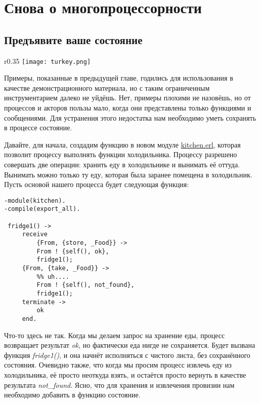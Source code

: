 \chapter{Снова о многопроцессорности}
\section{Предъявите ваше состояние}
\begin{wrapfigure}{r}{0.35\linewidth}
    \texttt{[image: turkey.png]}
\end{wrapfigure}
Примеры, показанные в предыдущей главе, годились для использования в качестве демонстрационного материала, но с таким ограниченным инструментарием далеко не уйдёшь.
Нет, примеры плохими не назовёшь, но от процессов и акторов пользы мало, когда они представлены только функциями и сообщениями.
Для устранения этого недостатка нам необходимо уметь сохранять в процессе состояние.

Давайте, для начала, создадим функцию в новом модуле \href{http://learnyousomeerlang.com/static/erlang/kitchen.erl}{kitchen.erl}, которая позволит процессу выполнять функции холодильника.
Процессу разрешено совершать две операции: хранить еду в холодильнике и вынимать её оттуда.
Вынимать можно только ту еду, которая была заранее помещена в холодильник.
Пусть основой нашего процесса будет следующая функция:
\begin{lstlisting}[style=erlang]
-module(kitchen).
-compile(export_all).
 
 fridge1() ->
     receive
         {From, {store, _Food}} ->
         From ! {self(), ok},
         fridge1();
     {From, {take, _Food}} ->
         %% uh....
         From ! {self(), not_found},
         fridge1();
     terminate ->
         ok
     end.
\end{lstlisting}

Что\--то здесь не так.
Когда мы делаем запрос на хранение еды, процесс возвращает результат \emph{ok}, но фактически еда нигде не сохраняется.
Будет вызвана функция \emph{fridge1()}, и она начнёт исполняться с чистого листа, без сохранённого состояния.
Очевидно также, что когда мы просим процесс извлечь еду из холодильника, её просто неоткуда взять, и остаётся просто вернуть в качестве результата \emph{not\_found}.
Ясно, что для хранения и извлечения провизии нам необходимо добавить в функцию состояние.

